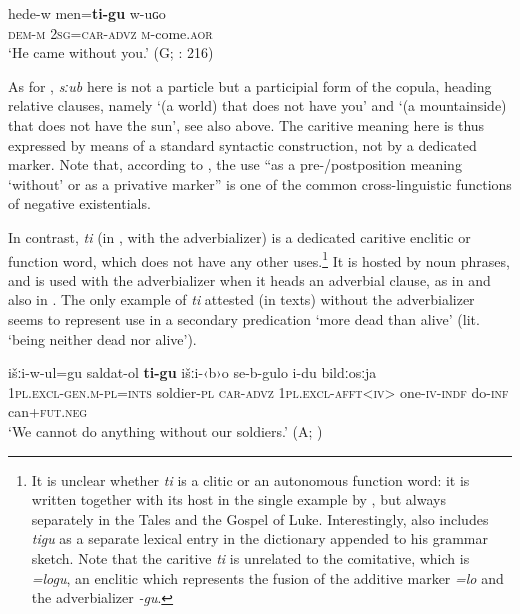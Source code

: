 \documentclass[output=paper,colorlinks=true, citecolor=brown]{langscibook}
\begin{document}
\ea 
    \label{ex:and:57}
    \gll hede{}-w men=\textbf{ti{}-gu} w{}-uɢo\\
          \textsc{dem-m} \textsc{2sg}=\textsc{car-advz} \textsc{m}{}-come.\textsc{aor} \\
    \glt ‘He came without you.’ (G; \citealt{Salimov2010}: 216)
\z 

As for , \textit{sːub} here is not a particle but a participial form of the copula, heading relative clauses, namely ‘(a world) that does not have you’ and ‘(a mountainside) that does not have the sun’, see also  above. The caritive meaning here is thus expressed by means of a standard syntactic construction, not by a dedicated marker. Note that, according to \citet[118]{Veselinova2013neg.exist}, the use “as a pre-/postposition meaning ‘without’ or as a privative marker” is one of the common cross-linguistic functions of negative existentials.

In contrast, \textit{ti} (in , with the adverbializer) is a dedicated caritive enclitic or function word, which does not have any other uses.\footnote{It is unclear whether \textrm{\textit{ti}} is a clitic or an autonomous function word: it is written together with its host in the single example by \citet{Salimov2010}, but always separately in the Tales and the Gospel of Luke. Interestingly, \citet[361]{Salimov2010} also includes \textrm{\textit{tigu}} as a separate lexical entry in the dictionary appended to his grammar sketch. Note that the caritive \textrm{\textit{ti}} is unrelated to the comitative, which is \textrm{\textit{=logu}}, an enclitic which represents the fusion of the additive marker \textrm{\textit{=lo}} and the adverbializer \textrm{\textit{{}-gu}}.} It is hosted by noun phrases, and is used with the adverbializer when it heads an adverbial clause, as in  and also in . The only example of \textit{ti} attested (in texts) without the adverbializer  seems to represent use in a secondary predication ‘more dead than alive’ (lit. ‘being neither dead nor alive’).

\ea
    \label{ex:and:58} 
    \gll išːi{}-w{}-ul=gu saldat{}-ol \textbf{ti{}-gu} išːi{}-‹b›o se{}-b{}-gulo  i-du bildːosːja\\
          \textsc{1pl.excl-gen.m-pl=ints} soldier-\textsc{pl} \textsc{car-advz} \textsc{1pl.excl-afft<iv}> one-\textsc{iv-indf}  do-\textsc{inf} can+\textsc{fut.neg} \\
    \glt ‘We cannot do anything without our soldiers.’ (A; )
\z 
\end{document}
